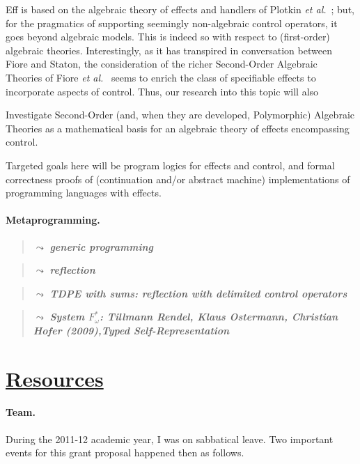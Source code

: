 \documentclass[11pt,twocolumn]{article}
\newcounter{CC}
\newenvironment{resenumerate}
  {\begin{list}{[\textbf{\arabic{CC}]}}
  {\usecounter{CC}
   \setlength{\topsep}{2pt}
   \setlength{\partopsep}{2pt}
   \setlength{\itemsep}{2.5pt}
   \setlength{\parsep}{2.5pt}
   \setlength{\leftmargin}{1.65em}
   \setlength{\labelwidth}{1.15em}
 }}
  {\end{list}}
\newcommand{\hide}[1]{}
\newcommand{\note}[1]{\begin{quote}{\color{blue}$\leadsto$ \bf\em
      #1}\end{quote}}
\newcommand{\hidenote}{\hide}
\newcommand{\etal}{\emph{et al.}}
\newcommand{\SystemL}{\mbox{System~$L$}}
\begin{document}
Eff is based on the algebraic theory of effects and handlers of Plotkin
\etal~\cite{PlotkinPowerAlgOpsAndGenEffs,PlotkinPretnar};
but, for the pragmatics of supporting seemingly non-algebraic control
operators, it goes beyond algebraic models.  This is indeed so with
respect to (first-order) algebraic theories.  Interestingly, as it has
transpired in conversation between Fiore and Staton, the consideration of
the richer Second-Order Algebraic Theories of Fiore
\etal~\cite{FioreHur,FioreMahmoud} seems to enrich the class of
specifiable effects to incorporate aspects of control.  Thus, our research
into this topic will also
\begin{resenumerate}\setcounter{CC}{5}
\item
  Investigate Second-Order (and, when they are developed, Polymorphic)
  Algebraic Theories as a mathematical basis for an algebraic theory of
  effects encompassing control.
\end{resenumerate}
Targeted goals here will be program logics for effects and control, and formal
correctness proofs of (continuation and/or abstract machine) implementations
of programming languages with effects.

\hidenote{Dependent CBPV}

\paragraph{Metaprogramming.}
\label{MetaprogrammingParagraph}

\note{generic programming}

\note{reflection}

\note{TDPE with sums: reflection with delimited control operators}

\note{System $F_\omega^*$: Tillmann Rendel, Klaus Ostermann, Christian
  Hofer (2009),Typed Self-Representation}

\hidenote{\SystemL internalisation of stacks?}

\hidenote{ssreflect?}

\section{\underline{Resources}}
\label{ResourcesSection}

\paragraph*{Team.}

During the 2011-12 academic year, I was on sabbatical leave.  Two important
events for this grant proposal happened then as follows.  
\end{document}
